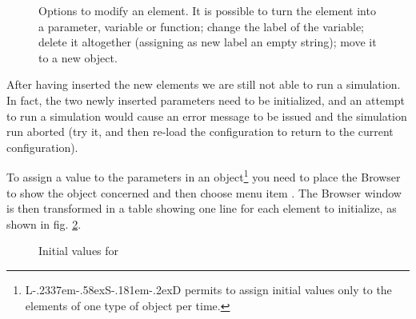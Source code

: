 \documentclass [11pt,a4paper] {book}
\def\LsD{{L\kern-.2337em\lower-.58ex\hbox{S}\kern-.181em\lower-.2ex\hbox{D}}\xspace}
\begin{document}
\begin{figure}[ht]
  \centering
  \caption{Options to modify an element. It is possible to turn the element into a parameter, variable or function; change the label of the variable; delete it altogether (assigning as new label an empty string); move it to a new object.}
  \label{fig:edit_var}
\end{figure}


After having inserted the new elements we are still not able to run a simulation. In
fact, the two newly inserted parameters need to be initialized, and an attempt to run a
simulation would cause an error message to be issued and the simulation run aborted (try it, and then re-load the configuration to return to the current configuration). 

To assign a value to the parameters in an object\footnote{\LsD permits to assign initial
values only to the elements of one type of object per time.} you need to place the
Browser to show the object concerned and then choose menu item .
The Browser window is then transformed in a table showing one line for each element to
initialize, as shown in fig. \ref{fig:init}.
\begin{figure}[ht]
  \centering
  \caption{Initial values for }
  \label{fig:init}
\end{figure}
\end{document}
